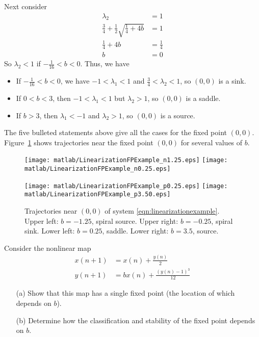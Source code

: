 \begin{xexample}
Next consider
\begin{equation}
\begin{split}
   \lambda_2 & = 1 \\
   \frac{3}{4} + \frac{1}{2} \sqrt{\frac{1}{4}+4b} & = 1 \\
   \frac{1}{4}+4b & = \frac{1}{4} \\
   b & = 0
\end{split}
\end{equation}
So $\lambda_2 < 1$ if $-\frac{1}{16} < b < 0$.
Thus, we have
\begin{itemize}
\item
If $-\frac{1}{16} < b < 0$, we have $-1 < \lambda_1 < 1$ and $\frac{3}{4} < \lambda_2 < 1$, so
$(0,0)$ is a sink.
\item
If $0 < b < 3$, then $-1 < \lambda_1 < 1$ but $\lambda_2 > 1$, so 
$(0,0)$ is a saddle.
\item
If $b > 3$, then $\lambda_1 < -1$ and $\lambda_2 > 1$, so
$(0,0)$ is a source.
\end{itemize}
The five bulleted statements above give all the cases for the
fixed point $(0,0)$.
Figure~\ref{fig:LinearizationFPExamples} shows trajectories
near the fixed point $(0,0)$ for several values of $b$.
\begin{figure}
\centerline{%
\texttt{[image: matlab/LinearizationFPExample\_n1.25.eps]}
\texttt{[image: matlab/LinearizationFPExample\_n0.25.eps]}
}
\centerline{%
\texttt{[image: matlab/LinearizationFPExample\_p0.25.eps]}
\texttt{[image: matlab/LinearizationFPExample\_p3.50.eps]}
}
\caption{Trajectories near $(0,0)$ of system
\eqref{eqn:linearizationexample}. Upper left: $b=-1.25$, spiral source.
Upper right: $b=-0.25$, spiral sink.
Lower left: $b=0.25$, saddle.
Lower right: $b=3.5$, source.}
\label{fig:LinearizationFPExamples}
\end{figure}
\end{xexample}

\newpage

\begin{exercises}
\begin{exercise}
\label{ex:nonlinmap1}
Consider the nonlinear map
\begin{equation}
\begin{split}
  x(n+1) & = x(n) + \frac{y(n)}{2} \\
  y(n+1) & = bx(n) + \frac{(y(n)-1)^3}{12}
\end{split}
\end{equation}
\begin{enumerate}
\item[(a)]
Show that this map has a single fixed point
(the location of which depends on $b$).
\item[(b)]
Determine how the classification and stability
of the fixed point depends on $b$.
\end{enumerate}
\end{exercise}
\end{exercises}

